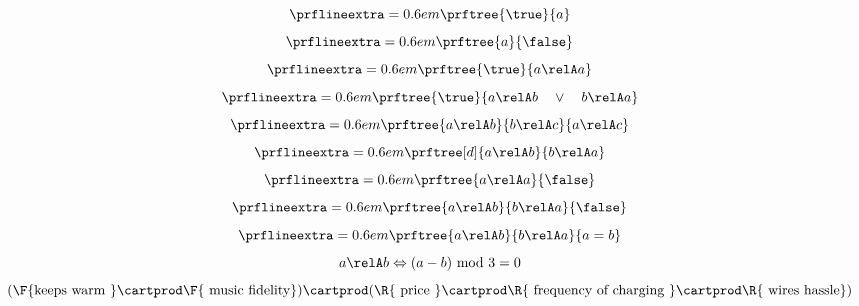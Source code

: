 {\begin{forslides}
\begin{equation*}
        \end{equation*}
        \begin{equation*}
            \label{eq:top1}
            \prflineextra=0.6em
            \prftree{\true}{a}
        \end{equation*}
        \begin{equation*}
            \label{eq:bot1}
            \prflineextra=0.6em
            \prftree{a}{\false}
        \end{equation*}
        \begin{equation*}
            \label{eq:rel_refl}
            \prflineextra=0.6em
            \prftree{\true}{a\relA a}
        \end{equation*}
        \begin{equation*}
            \label{eq:rel_tot}
            \prflineextra=0.6em
            \prftree{\true}{a\relA b \quad \vee \quad b\relA a}
        \end{equation*}
        \begin{equation*}
            \label{eq:rel_tran}
            \prflineextra=0.6em
            \prftree{a\relA b}{b\relA c}{a\relA c}
        \end{equation*}
        \begin{equation*}
            \label{eq:rel_sym}
            \prflineextra=0.6em
            \prftree[d]{a \relA b}{b\relA a}
        \end{equation*}
        \begin{equation*}
            \label{eq:rel_irr}
            \prflineextra=0.6em
            \prftree{a \relA a}{\false}
        \end{equation*}
        \begin{equation*}
            \label{eq:rel_asy}
            \prflineextra=0.6em
            \prftree{a \relA b}{b\relA a}{\false}
        \end{equation*}
        \begin{equation*}
            \label{eq:rel_antisy}
            \prflineextra=0.6em
            \prftree{a \relA b}{b\relA a}{a=b}
        \end{equation*}
        \begin{equation*}
            \label{eq:ex}
            a\relA b \Leftrightarrow (a-b) \text{ mod }3=0
        \end{equation*}
        \begin{equation*}
            \label{eq:fun_cost}
            (\F{\text{keeps warm }}\cartprod \F{\text{ music fidelity}})\cartprod(\R{\text{ price }} \cartprod \R{\text{ frequency of charging }}\cartprod \R{\text{ wires hassle}})

\end{equation*}
\end{forslides}}
